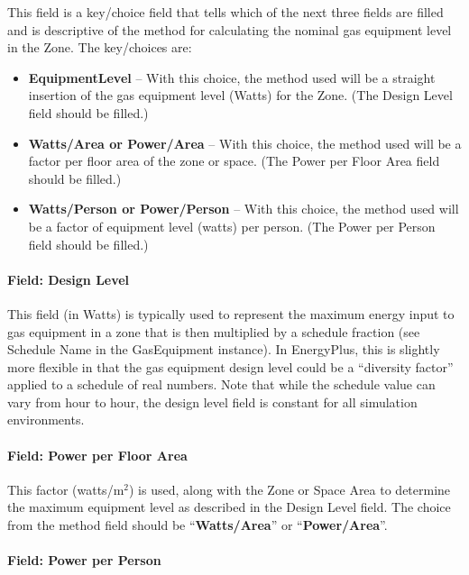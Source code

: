 This field is a key/choice field that tells which of the next three fields are filled and is descriptive of the method for calculating the nominal gas equipment level in the Zone. The key/choices are:

\begin{itemize}
\tightlist
\item
  \textbf{EquipmentLevel} -- With this choice, the method used will be a straight insertion of the gas equipment level (Watts) for the Zone. (The Design Level field should be filled.)
\item
  \textbf{Watts/Area or Power/Area} -- With this choice, the method used will be a factor per floor area of the zone or space. (The Power per Floor Area field should be filled.)
\item
  \textbf{Watts/Person or Power/Person} -- With this choice, the method used will be a factor of equipment level (watts) per person. (The Power per Person field should be filled.)
\end{itemize}

\paragraph{Field: Design Level}\label{field-design-level-1-000-gas-definition}

This field (in Watts) is typically used to represent the maximum energy input to gas equipment in a zone that is then multiplied by a schedule fraction (see Schedule Name in the GasEquipment instance). In EnergyPlus, this is slightly more flexible in that the gas equipment design level could be a ``diversity factor'' applied to a schedule of real numbers. Note that while the schedule value can vary from hour to hour, the design level field is constant for all simulation environments.

\paragraph{Field: Power per Floor Area}\label{field-power-per-zone-floor-area-gas-definition}

This factor (watts/m\(^{2}\)) is used, along with the Zone or Space Area to determine the maximum equipment level as described in the Design Level field. The choice from the method field should be ``\textbf{Watts/Area}'' or ``\textbf{Power/Area}''.

\paragraph{Field: Power per Person}\label{field-power-per-person-gas-definition}

